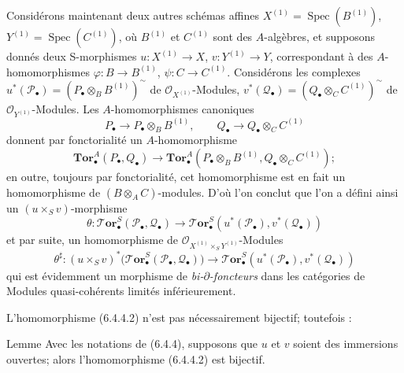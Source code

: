 \begin{env}[6.4.4]
Considérons maintenant deux autres schémas affines
$X^{(1)}=\operatorname{Spec}(B^{(1)})$,
$Y^{(1)}=\operatorname{Spec}(C^{(1)})$, où $B^{(1)}$ et $C^{(1)}$ sont des
$A$-algèbres, et supposons donnés deux
S-morphismes $u:X^{(1)}\to X$, $v:Y^{(1)}\to Y$, correspondant à des
$A$-homomorphismes $\varphi:B\to B^{(1)}$, $\psi:C\to C^{(1)}$.
Considérons les complexes
$u^*(\mathscr P_\bullet)=(P_\bullet\otimes_B B^{(1)})^{\sim}$ de
$\mathscr O_{X^{(1)}}$-Modules,
$v^*(\mathscr Q_\bullet)=(Q_\bullet\otimes_C C^{(1)})^{\sim}$ de
$\mathscr O_{Y^{(1)}}$-Modules. Les $A$-homomorphismes canoniques
\[
  P_\bullet\longrightarrow P_\bullet\otimes_B B^{(1)},
  \qquad
  Q_\bullet\longrightarrow Q_\bullet\otimes_C C^{(1)}
\]
donnent par fonctorialité un $A$-homomorphisme
\[
  \mathbf{Tor}_\bullet^A(P_\bullet,Q_\bullet)
  \longrightarrow
  \mathbf{Tor}_\bullet^A
  (P_\bullet\otimes_B B^{(1)},Q_\bullet\otimes_C C^{(1)});
\]
en outre, toujours par fonctorialité, cet homomorphisme est en fait un
homomorphisme de $(B\otimes_A C)$-modules. D'où l'on conclut que l'on a défini
ainsi un $(u\times_S v)$-morphisme
\[
  \theta:\boldsymbol{\mathscr{T}\!or}_\bullet^S(\mathscr P_\bullet,\mathscr Q_\bullet)
  \longrightarrow
  \boldsymbol{\mathscr{T}\!or}_\bullet^S
  (u^*(\mathscr P_\bullet),v^*(\mathscr Q_\bullet))
  \tag{6.4.4.1}\label{III.6.4.4.1.fr}
\]
et par suite, un homomorphisme de
$\mathscr O_{X^{(1)}\times_S Y^{(1)}}$-Modules
\[
  \theta^\sharp:(u\times_S v)^*
  \bigl(\boldsymbol{\mathscr{T}\!or}_\bullet^S(\mathscr P_\bullet,\mathscr Q_\bullet)\bigr)
  \longrightarrow
  \boldsymbol{\mathscr{T}\!or}_\bullet^S
  (u^*(\mathscr P_\bullet),v^*(\mathscr Q_\bullet))
  \tag{6.4.4.2}\label{III.6.4.4.2.fr}
\]
qui est évidemment un morphisme de \emph{bi-$\partial$-foncteurs} dans les catégories
de Modules quasi-cohérents limités inférieurement.

L'homomorphisme (6.4.4.2) n'est pas nécessairement bijectif; toutefois :
\end{env}

\begin{namedtheorem}[6.4.5]{Lemme}
Avec les notations de \textup{(6.4.4)}, supposons que $u$ et $v$ soient des immersions
ouvertes; alors l'homomorphisme \textup{(6.4.4.2)} est bijectif.
\end{namedtheorem}


